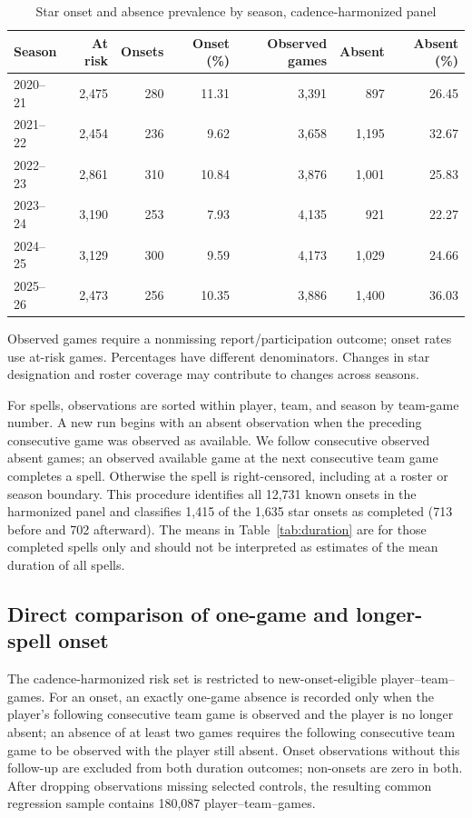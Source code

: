 \documentclass[11pt]{article}
\begin{document}
\begin{table}[!htbp]\centering
\caption{Star onset and absence prevalence by season, cadence-harmonized panel}\label{tab:seasonprev}
\small\setlength{\tabcolsep}{5pt}
\begin{tabular}{@{}lrrrrrr@{}}\toprule
Season & At risk & Onsets & Onset (\%) & Observed games & Absent & Absent (\%)\\\midrule
2020--21 & 2,475 & 280 & 11.31 & 3,391 & 897 & 26.45\\
2021--22 & 2,454 & 236 & 9.62 & 3,658 & 1,195 & 32.67\\
2022--23 & 2,861 & 310 & 10.84 & 3,876 & 1,001 & 25.83\\
2023--24 & 3,190 & 253 & 7.93 & 4,135 & 921 & 22.27\\
2024--25 & 3,129 & 300 & 9.59 & 4,173 & 1,029 & 24.66\\
2025--26 & 2,473 & 256 & 10.35 & 3,886 & 1,400 & 36.03\\\bottomrule
\end{tabular}\par\smallskip\raggedright\footnotesize
Observed games require a nonmissing report/participation outcome; onset rates use at-risk games. Percentages have different denominators. Changes in star designation and roster coverage may contribute to changes across seasons.
\end{table}

For spells, observations are sorted within player, team, and season by team-game number. A new run begins with an absent observation when the preceding consecutive game was observed as available. We follow consecutive observed absent games; an observed available game at the next consecutive team game completes a spell. Otherwise the spell is right-censored, including at a roster or season boundary. This procedure identifies all 12,731 known onsets in the harmonized panel and classifies 1,415 of the 1,635 star onsets as completed (713 before and 702 afterward). The means in Table~\ref{tab:duration} are for those completed spells only and should not be interpreted as estimates of the mean duration of all spells.

\FloatBarrier
\subsection{Direct comparison of one-game and longer-spell onset}\label{app:stacked}
The cadence-harmonized risk set is restricted to new-onset-eligible player--team--games. For an onset, an exactly one-game absence is recorded only when the player's following consecutive team game is observed and the player is no longer absent; an absence of at least two games requires the following consecutive team game to be observed with the player still absent. Onset observations without this follow-up are excluded from both duration outcomes; non-onsets are zero in both. After dropping observations missing selected controls, the resulting common regression sample contains 180,087 player--team--games.
\end{document}
